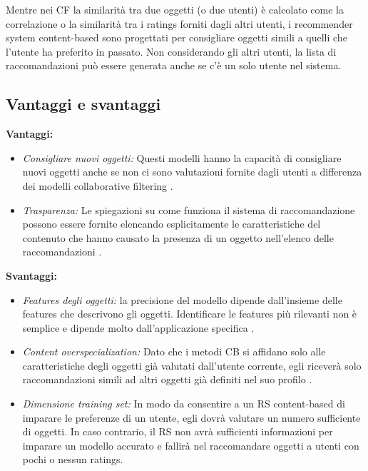 \documentclass[12pt,italian]{report}
\begin{document}
Mentre nei CF la similarità tra due oggetti (o due utenti) è calcolato come la correlazione o la similarità tra i ratings forniti dagli altri utenti, i recommender system content-based sono progettati per consigliare oggetti simili a quelli che l'utente ha preferito in passato. Non considerando gli altri utenti, la lista di raccomandazioni può essere generata anche se c'è un solo utente nel sistema.

\subsection{Vantaggi e svantaggi}
\textbf{Vantaggi:}
\begin{itemize}
 \item \textit{Consigliare nuovi oggetti:} Questi modelli hanno la capacità di consigliare nuovi oggetti anche se non ci sono valutazioni fornite dagli utenti a differenza dei modelli collaborative filtering \cite{recsys-principle-methods-evaluation}.
 
 \item \textit{Trasparenza:} Le spiegazioni su come funziona il sistema di raccomandazione possono essere fornite elencando esplicitamente le caratteristiche del contenuto che hanno causato la presenza di un oggetto nell'elenco delle raccomandazioni \cite{transparency}. 
\end{itemize}

\noindent \textbf{Svantaggi:}
\begin{itemize}
 \item \textit{Features degli oggetti:} la precisione del modello dipende dall'insieme delle features che descrivono gli oggetti. Identificare le features più rilevanti non è semplice e dipende molto dall'applicazione specifica \cite{survey-mattia}.
 
 \item \textit{Content overspecialization:} Dato che i metodi CB si affidano solo alle caratteristiche degli oggetti già valutati dall'utente corrente, egli riceverà solo raccomandazioni simili ad altri oggetti già definiti nel suo profilo \cite{recsys-principle-methods-evaluation}.
 
 \item \textit{Dimensione training set:} In modo da consentire a un RS content-based di imparare le preferenze di un utente, egli dovrà valutare un numero sufficiente di oggetti. In caso contrario, il RS non avrà sufficienti informazioni per imparare un modello accurato e fallirà nel raccomandare oggetti a utenti con pochi o nessun ratings.
\end{itemize}
\end{document}
